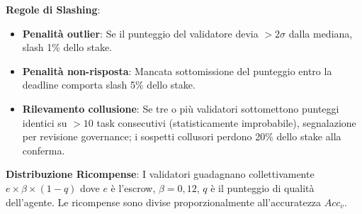 \documentclass[11pt]{article}
\begin{document}
\textbf{Regole di Slashing}:
\begin{itemize}[noitemsep]
  \item \textbf{Penalità outlier}: Se il punteggio del validatore devia $>2\sigma$ dalla mediana, slash 1\% dello stake.
  \item \textbf{Penalità non-risposta}: Mancata sottomissione del punteggio entro la deadline comporta slash 5\% dello stake.
  \item \textbf{Rilevamento collusione}: Se tre o più validatori sottomettono punteggi identici su $>10$ task consecutivi (statisticamente improbabile), segnalazione per revisione governance; i sospetti collusori perdono 20\% dello stake alla conferma.
\end{itemize}
\textbf{Distribuzione Ricompense}: I validatori guadagnano collettivamente $e \times \beta \times (1-q)$ dove $e$ è l'escrow, $\beta=0,12$, $q$ è il punteggio di qualità dell'agente. Le ricompense sono divise proporzionalmente all'accuratezza $Acc_v$.
\end{document}

